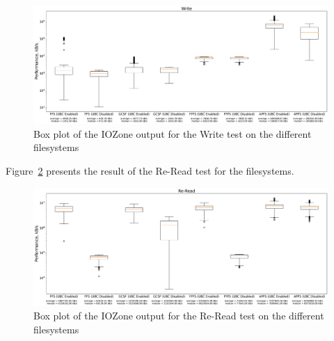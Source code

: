 \begin{figure}[!ht]
	\label{fig:res_box_write}
	\begin{center}
		\includegraphics[width=1.0\textwidth]{figures.nosync/benchmarking/Write-boxplot.pdf}
	\end{center}
	\caption{Box plot of the IOZone output for the Write test on the different filesystems}
\end{figure}

\FloatBarrier

Figure~\ref{fig:res_box_reread} presents the result of the \mbox{Re-Read} test for the filesystems. 

\begin{figure}[!ht]
	\label{fig:res_box_reread}
	\begin{center}
		\includegraphics[width=1.0\textwidth]{figures.nosync/benchmarking/Re-Read-boxplot.pdf}
	\end{center}
	\caption{Box plot of the IOZone output for the Re-Read test on the different filesystems}
\end{figure}

